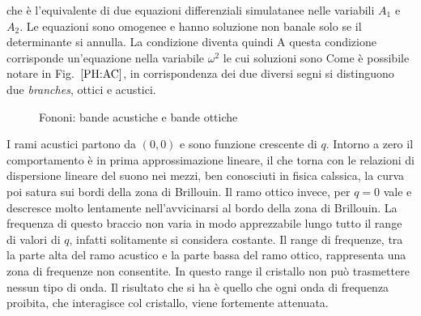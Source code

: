 \documentclass[a4paper,12pt]{article}
\begin{document}
che è l'equivalente di due equazioni differenziali simulatanee nelle variabili $A_1$ e $A_2$. Le equazioni sono omogenee e hanno soluzione non banale solo se il determinante si annulla. La condizione diventa quindi
A questa condizione corrisponde un'equazione nella variabile $\omega^2$ le cui soluzioni sono
Come è possibile notare in Fig.~$\ref{PH:AC}$, in corrispondenza dei due diversi segni si distinguono due \textit{branches}, ottici e acustici.
\begin{figure}
	\centering
	\caption{Fononi: bande acustiche e bande ottiche}
	\label{PH:AC}
\end{figure}
I rami acustici partono da $(0,0)$ e sono funzione crescente di $q$. Intorno a zero il comportamento è in prima approssimazione lineare, il che torna con le relazioni di dispersione lineare del suono nei mezzi, ben conosciuti in fisica calssica, la curva poi satura sui bordi della zona di Brillouin. Il ramo ottico invece, per $q=0$ vale 
e descresce molto lentamente nell'avvicinarsi al bordo della zona di Brillouin. La frequenza di questo braccio non varia in modo apprezzabile lungo tutto il range di valori di $q$, infatti solitamente si considera costante. Il range di frequenze, tra la parte alta del ramo acustico e la parte bassa del ramo ottico, rappresenta una zona di frequenze non consentite. In questo range il cristallo non può trasmettere nessun tipo di onda. Il risultato che si ha è quello che ogni onda di frequenza proibita, che interagisce col cristallo, viene fortemente attenuata.
\end{document}
